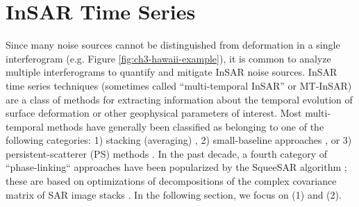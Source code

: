 

\section{InSAR Time Series}
\label{sec:ch3-insar-ts}

Since many noise sources cannot be distinguished from deformation in a single interferogram (e.g. Figure \ref{fig:ch3-hawaii-example}), it is common to analyze multiple interferograms to quantify and mitigate InSAR noise sources.
InSAR time series techniques (sometimes called ``multi-temporal InSAR'' or MT-InSAR) are a class of methods for extracting information about the temporal evolution of surface deformation or other geophysical parameters of interest.  Most multi-temporal methods have generally been classified as belonging to one of the following categories: 1) stacking (averaging) \citep{Zebker1997AtmosphericEffectsInterferometric, Sandwell1998PhaseGradientApproach}, 2) small-baseline approaches \citep{Berardino2002NewAlgorithmSurface}, or 3) persistent-scatterer (PS) methods \citep{Ferretti2001PermanentScatterersSar, Hooper2006PersistentScatterRadar}. In the past decade, a fourth category of ``phase-linking`` approaches have been popularized by the SqueeSAR algorithm \citep{Ferretti2011NewAlgorithmProcessing}; these are based on optimizations of decompositions of the complex covariance matrix of SAR image stacks \citep{Guarnieri2008ExploitationTargetStatistics, Ansari2018EfficientHighPrecision}. In the following section, we focus on (1) and (2).


